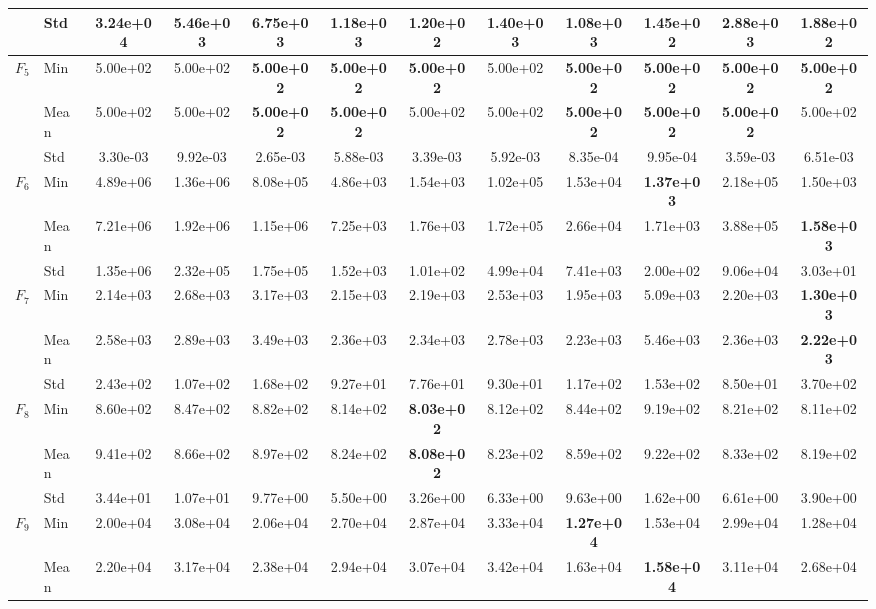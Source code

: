 \begin{center}
\begin{longtable}{clcccccccccc}
 & Std & 3.24e+04 & 5.46e+03 & 6.75e+03 & 1.18e+03 & 1.20e+02 & 1.40e+03 & 1.08e+03 & 1.45e+02 & 2.88e+03 & 1.88e+02 \\
\midrule
\multirow{3}{*}{$F_{5}$} & Min & 5.00e+02 & 5.00e+02 & \textbf{5.00e+02} & \textbf{5.00e+02} & \textbf{5.00e+02} & 5.00e+02 & \textbf{5.00e+02} & \textbf{5.00e+02} & \textbf{5.00e+02} & \textbf{5.00e+02} \\
 & Mean & 5.00e+02 & 5.00e+02 & \textbf{5.00e+02} & \textbf{5.00e+02} & 5.00e+02 & 5.00e+02 & \textbf{5.00e+02} & \textbf{5.00e+02} & \textbf{5.00e+02} & 5.00e+02 \\
 & Std & 3.30e-03 & 9.92e-03 & 2.65e-03 & 5.88e-03 & 3.39e-03 & 5.92e-03 & 8.35e-04 & 9.95e-04 & 3.59e-03 & 6.51e-03 \\
\midrule
\multirow{3}{*}{$F_{6}$} & Min & 4.89e+06 & 1.36e+06 & 8.08e+05 & 4.86e+03 & 1.54e+03 & 1.02e+05 & 1.53e+04 & \textbf{1.37e+03} & 2.18e+05 & 1.50e+03 \\
 & Mean & 7.21e+06 & 1.92e+06 & 1.15e+06 & 7.25e+03 & 1.76e+03 & 1.72e+05 & 2.66e+04 & 1.71e+03 & 3.88e+05 & \textbf{1.58e+03} \\
 & Std & 1.35e+06 & 2.32e+05 & 1.75e+05 & 1.52e+03 & 1.01e+02 & 4.99e+04 & 7.41e+03 & 2.00e+02 & 9.06e+04 & 3.03e+01 \\
\midrule
\multirow{3}{*}{$F_{7}$} & Min & 2.14e+03 & 2.68e+03 & 3.17e+03 & 2.15e+03 & 2.19e+03 & 2.53e+03 & 1.95e+03 & 5.09e+03 & 2.20e+03 & \textbf{1.30e+03} \\
 & Mean & 2.58e+03 & 2.89e+03 & 3.49e+03 & 2.36e+03 & 2.34e+03 & 2.78e+03 & 2.23e+03 & 5.46e+03 & 2.36e+03 & \textbf{2.22e+03} \\
 & Std & 2.43e+02 & 1.07e+02 & 1.68e+02 & 9.27e+01 & 7.76e+01 & 9.30e+01 & 1.17e+02 & 1.53e+02 & 8.50e+01 & 3.70e+02 \\
\midrule
\multirow{3}{*}{$F_{8}$} & Min & 8.60e+02 & 8.47e+02 & 8.82e+02 & 8.14e+02 & \textbf{8.03e+02} & 8.12e+02 & 8.44e+02 & 9.19e+02 & 8.21e+02 & 8.11e+02 \\
 & Mean & 9.41e+02 & 8.66e+02 & 8.97e+02 & 8.24e+02 & \textbf{8.08e+02} & 8.23e+02 & 8.59e+02 & 9.22e+02 & 8.33e+02 & 8.19e+02 \\
 & Std & 3.44e+01 & 1.07e+01 & 9.77e+00 & 5.50e+00 & 3.26e+00 & 6.33e+00 & 9.63e+00 & 1.62e+00 & 6.61e+00 & 3.90e+00 \\
\midrule
\multirow{3}{*}{$F_{9}$} & Min & 2.00e+04 & 3.08e+04 & 2.06e+04 & 2.70e+04 & 2.87e+04 & 3.33e+04 & \textbf{1.27e+04} & 1.53e+04 & 2.99e+04 & 1.28e+04 \\
 & Mean & 2.20e+04 & 3.17e+04 & 2.38e+04 & 2.94e+04 & 3.07e+04 & 3.42e+04 & 1.63e+04 & \textbf{1.58e+04} & 3.11e+04 & 2.68e+04 \\

\end{longtable}
\end{center}
